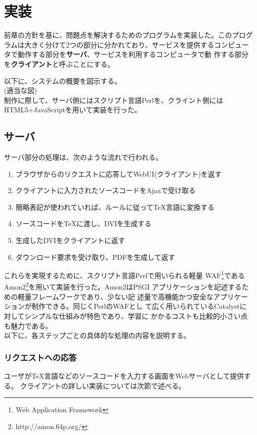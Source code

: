 \documentclass[a4j,9pt,titlepage]{jsarticle}
\begin{document}
\section{実装}
前章の方針を基に、問題点を解決するためのプログラムを実装した。このプログ
ラムは大きく分けて2つの部分に分かれており、サービスを提供するコンピュー
タで動作する部分を{\bfseries サーバ}、サービスを利用するコンピュータで動
作する部分を{\bfseries クライアント}と呼ぶことにする。

以下に、システムの概要を図示する。\\

(適当な図)\\

制作に際して、サーバ側にはスクリプト言語Perlを、クライント側には
HTML5+JavaScriptを用いて実装を行った。

\subsection{サーバ}
サーバ部分の処理は、次のような流れで行われる。
\begin{enumerate}
 \item ブラウザからのリクエストに応答してWebUI(クライアント)を返す
 \item クライアントに入力されたソースコードをAjaxで受け取る
 \item 簡略表記が使われていれば、ルールに従ってTeX言語に変換する
 \item ソースコードをTeXに渡し、DVIを生成する 
 \item 生成したDVIをクライアントに返す
 \item ダウンロード要求を受け取り、PDFを生成して返す
\end{enumerate}
これらを実現するために、スクリプト言語Perlで用いられる軽量
WAF\footnote{Web Application Framework}である
Amon2\footnote{http://amon.64p.org/}を用いて実装を行った。Amon2はPSGI
アプリケーションを記述するための軽量フレームワークであり、少ない記
述量で高機能かつ安全なアプリケーションが制作できる。同じくPerlのWAFとし
て広く用いられているCatalystに対してシンプルな仕組みが特色であり、学習に
かかるコストも比較的小さい点も魅力である。\\

以下に、各ステップごとの具体的な処理の内容を説明する。
\subsubsection{リクエストへの応答}
ユーザがTeX言語などのソースコードを入力する画面をWebサーバとして提供する。
クライアントの詳しい実装については次節で述べる。
\end{document}
